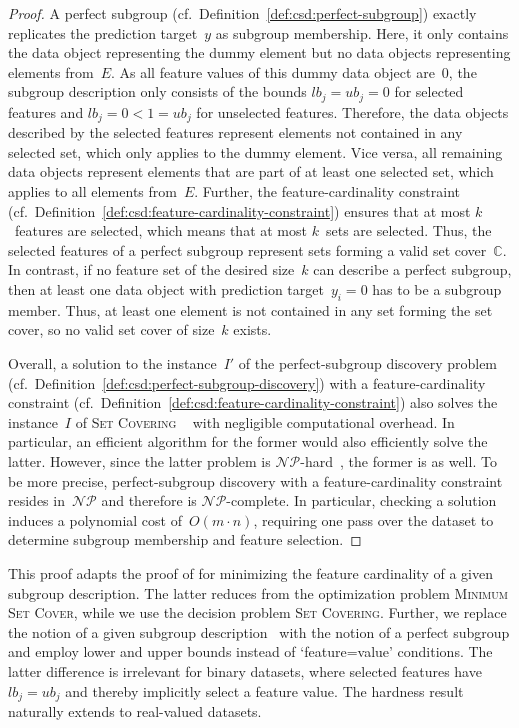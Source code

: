 \begin{proof}
	A perfect subgroup (cf.~Definition~\ref{def:csd:perfect-subgroup}) exactly replicates the prediction target~$y$ as subgroup membership.
	Here, it only contains the data object representing the dummy element but no data objects representing elements from~$E$.
	As all feature values of this dummy data object are~0, the subgroup description only consists of the bounds $\mathit{lb}_j = \mathit{ub}_j = 0$ for selected features and $\mathit{lb}_j = 0 < 1 = \mathit{ub}_j$ for unselected features.
	Therefore, the data objects described by the selected features represent elements not contained in any selected set, which only applies to the dummy element.
	Vice versa, all remaining data objects represent elements that are part of at least one selected set, which applies to all elements from~$E$.
	Further, the feature-cardinality constraint (cf.~Definition~\ref{def:csd:feature-cardinality-constraint}) ensures that at most $k$~features are selected, which means that at most $k$~sets are selected.
	Thus, the selected features of a perfect subgroup represent sets forming a valid set cover~$\mathbb{C}$.
	In contrast, if no feature set of the desired size~$k$ can describe a perfect subgroup, then at least one data object with prediction target~$y_i = 0$ has to be a subgroup member.
	Thus, at least one element is not contained in any set forming the set cover, so no valid set cover of size~$k$ exists.
	
	Overall, a solution to the instance~$I'$ of the perfect-subgroup discovery problem (cf.~Definition~\ref{def:csd:perfect-subgroup-discovery}) with a feature-cardinality constraint (cf.~Definition~\ref{def:csd:feature-cardinality-constraint}) also solves the instance~$I$ of \textsc{Set Covering} ~\cite{karp1972reducibility} with negligible computational overhead.
	In particular, an efficient algorithm for the former would also efficiently solve the latter.
	However, since the latter problem is $\mathcal{NP}$-hard~\cite{karp1972reducibility}, the former is as well.
	To be more precise, perfect-subgroup discovery with a feature-cardinality constraint resides in~$\mathcal{NP}$ and therefore is $\mathcal{NP}$-complete.
	In particular, checking a solution induces a polynomial cost of~$O(m \cdot n)$, requiring one pass over the dataset to determine subgroup membership and feature selection.
\end{proof}
%
This proof adapts the proof of \cite{boley2009non} for minimizing the feature cardinality of a given subgroup description.
The latter reduces from the optimization problem \textsc{Minimum Set Cover}, while we use the decision problem \textsc{Set Covering}.
Further, we replace the notion of a given subgroup description~\cite{boley2009non} with the notion of a perfect subgroup and employ lower and upper bounds instead of `feature=value' conditions.
The latter difference is irrelevant for binary datasets, where selected features have $\mathit{lb}_j = \mathit{ub}_j$ and thereby implicitly select a feature value.
The hardness result naturally extends to real-valued datasets.

